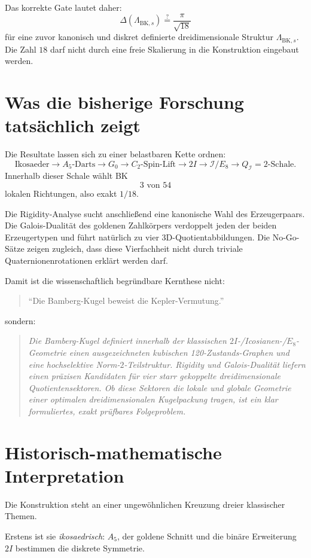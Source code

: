 \documentclass[11pt,a4paper]{article}
\theoremstyle{definition}
\theoremstyle{remark}
\newcommand{\BK}{\mathrm{BK}}
\newcommand{\QI}{Q_{\mathcal I}}
\newcommand{\Ico}{\mathcal I}
\begin{document}
Das korrekte Gate lautet daher:
\[
\boxed{
\Delta(\Lambda_{\BK,s})
\stackrel{?}{=}
\frac{\pi}{\sqrt{18}}
}
\]
für eine zuvor kanonisch und diskret definierte dreidimensionale Struktur $\Lambda_{\BK,s}$. Die Zahl $18$ darf nicht durch eine freie Skalierung in die Konstruktion eingebaut werden.

\section{Was die bisherige Forschung tatsächlich zeigt}
Die Resultate lassen sich zu einer belastbaren Kette ordnen:
\[
\text{Ikosaeder}
\to
A_5\text{-Darts}
\to
G_0
\to
C_2\text{-Spin-Lift}
\to
2I
\to
\Ico/E_8
\to
\QI=2\text{-Schale}.
\]
Innerhalb dieser Schale wählt BK
\[
3\text{ von }54
\]
lokalen Richtungen, also exakt $1/18$.

Die Rigidity-Analyse sucht anschließend eine kanonische Wahl des Erzeugerpaars. Die Galois-Dualität des goldenen Zahlkörpers verdoppelt jeden der beiden Erzeugertypen und führt natürlich zu vier 3D-Quotientabbildungen. Die No-Go-Sätze zeigen zugleich, dass diese Vierfachheit nicht durch triviale Quaternionenrotationen erklärt werden darf.

Damit ist die wissenschaftlich begründbare Kernthese nicht:
\begin{quote}
``Die Bamberg-Kugel beweist die Kepler-Vermutung.''
\end{quote}
sondern:
\begin{quote}
\emph{Die Bamberg-Kugel definiert innerhalb der klassischen $2I$-/Icosianen-/$E_8$-Geometrie einen ausgezeichneten kubischen 120-Zustands-Graphen und eine hochselektive Norm-$2$-Teilstruktur. Rigidity und Galois-Dualität liefern einen präzisen Kandidaten für vier starr gekoppelte dreidimensionale Quotientensektoren. Ob diese Sektoren die lokale und globale Geometrie einer optimalen dreidimensionalen Kugelpackung tragen, ist ein klar formuliertes, exakt prüfbares Folgeproblem.}
\end{quote}

\section{Historisch-mathematische Interpretation}
Die Konstruktion steht an einer ungewöhnlichen Kreuzung dreier klassischer Themen.

Erstens ist sie \emph{ikosaedrisch}: $A_5$, der goldene Schnitt und die binäre Erweiterung $2I$ bestimmen die diskrete Symmetrie.
\end{document}

